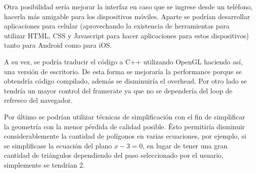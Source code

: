 \documentclass[12pt]{article}
\begin{document}
Otra posibilidad sería mejorar la interfaz en caso que se ingrese desde un teléfono, hacerla más amigable para los dispositivos móviles. Aparte se podrían desarrollar aplicaciones para celular (aprovechando la existencia de herramientas para utilizar HTML, CSS y Javascript para hacer aplicaciones para estos dispositivos) tanto para Android como para iOS. 

A su vez, se podría traducir el código a C++ utilizando OpenGL haciendo así, una versión de escritorio. De esta forma se mejoraría la performance porque se obtendría código compilado, además se disminuiría el overhead. Por otro lado se tendría un mayor control del framerate ya que no se dependería del loop de refresco del navegador.

Por último se podrían utilizar técnicas de simplificación\cite{simplificacion}\cite{realtimerendering} con el fin de simplificar la geometría con la menor pérdida de calidad posible. Ésto permitiría disminuir considerablemente la cantidad de polígonos en varias ecuaciones, por ejemplo, si se simplificase la ecuación del plano $x-3=0$, en lugar de tener una gran cantidad de triángulos dependiendo del paso seleccionado por el usuario, simplemente se tendrían 2.

\clearpage
\end{document}
